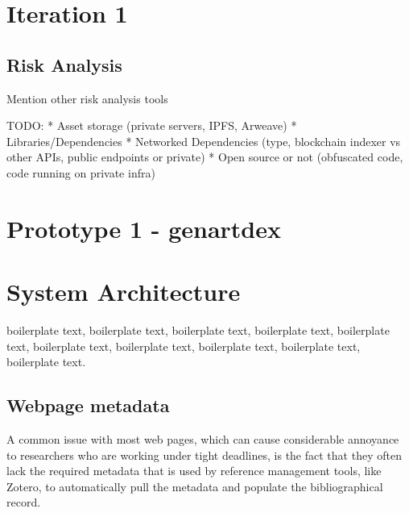 \section {Iteration 1}
























\subsection{Risk Analysis}

Mention other risk analysis tools \cite{l2beatL2BEATStateLayer2024}

TODO:
* Asset storage (private servers, IPFS, Arweave)
* Libraries/Dependencies
* Networked Dependencies (type, blockchain indexer vs other APIs, public endpoints or private)
* Open source or not (obfuscated code, code running on private infra)








\section {Prototype 1 - genartdex}

\section{System Architecture}

boilerplate text, boilerplate text, boilerplate text, boilerplate text, boilerplate text, boilerplate text, boilerplate text, boilerplate text, boilerplate text, boilerplate text.


\subsection{Webpage metadata}

A common issue with most web pages, which can cause considerable annoyance to researchers who are working under tight deadlines, is the fact that they often lack the required metadata that is used by reference management tools, like Zotero, to automatically pull the metadata and populate the bibliographical record.

